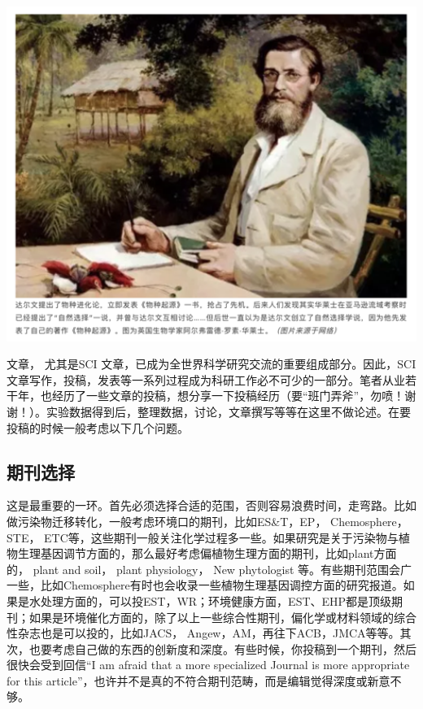 \documentclass[
]{book}
\begin{document}
\includegraphics[width=6.67in]{images/tougao1}

文章， 尤其是SCI 文章，已成为全世界科学研究交流的重要组成部分。因此，SCI文章写作，投稿，发表等一系列过程成为科研工作必不可少的一部分。笔者从业若干年，也经历了一些文章的投稿，想分享一下投稿经历（要``班门弄斧''，勿喷！谢谢！）。实验数据得到后，整理数据，讨论，文章撰写等等在这里不做论述。在要投稿的时候一般考虑以下几个问题。

\hypertarget{ux671fux520aux9009ux62e9}{%
\subsection{期刊选择}\label{ux671fux520aux9009ux62e9}}

这是最重要的一环。首先必须选择合适的范围，否则容易浪费时间，走弯路。比如做污染物迁移转化，一般考虑环境口的期刊，比如ES\&T，EP， Chemosphere， STE， ETC等，这些期刊一般关注化学过程多一些。如果研究是关于污染物与植物生理基因调节方面的，那么最好考虑偏植物生理方面的期刊，比如plant方面的， plant and soil， plant physiology， New phytologist 等。有些期刊范围会广一些，比如Chemosphere有时也会收录一些植物生理基因调控方面的研究报道。如果是水处理方面的，可以投EST，WR；环境健康方面，EST、EHP都是顶级期刊；如果是环境催化方面的，除了以上一些综合性期刊，偏化学或材料领域的综合性杂志也是可以投的，比如JACS， Angew，AM，再往下ACB，JMCA等等。其次，也要考虑自己做的东西的创新度和深度。有些时候，你投稿到一个期刊，然后很快会受到回信``I am afraid that a more specialized Journal is more appropriate for this article''，也许并不是真的不符合期刊范畴，而是编辑觉得深度或新意不够。
\end{document}
